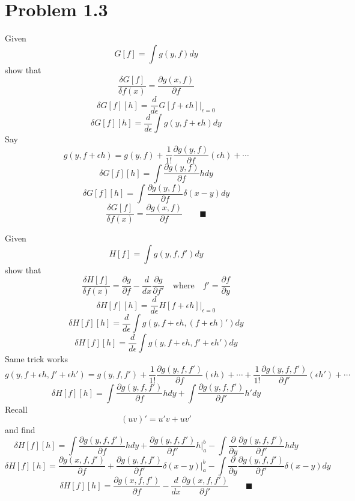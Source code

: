 \documentclass{amsart}
\begin{document}
\section*{Problem 1.3}
Given \[G[f]=\int g(y,f)dy\]
show that \[\frac{\delta G[f]}{\delta f(x)}=\frac{\partial g(x,f)}{\partial f} \]
\[\delta G[f][h]=\frac{d}{d\epsilon}G[f+\epsilon h]\Big\vert_{\epsilon=0}\]
\[\delta G[f][h]=\frac{d}{d\epsilon}\int g(y,f+\epsilon h)dy\]
Say \[g(y,f+\epsilon h)=g(y,f)+\frac{1}{1!}\frac{\partial g(y,f)}{\partial f}(\epsilon h) + \cdots \]
\[\delta G[f][h]=\int\frac{\partial g(y,f)}{\partial f}hdy\]
\[\delta G[f][h]=\int\frac{\partial g(y,f)}{\partial f}\delta(x-y)dy\]
\[\frac{\delta G[f]}{\delta f(x)}=\frac{\partial g(x,f)}{\partial f} \qquad \blacksquare\]

Given \[H[f]=\int g(y,f,f')dy\]
show that \[\frac{\delta H[f]}{\delta f(x)}=\frac{\partial g}{\partial f} -\frac{d}{dx}\frac{\partial g}{\partial f'} \quad\text{where}\quad f'=\frac{\partial f}{\partial y}\]
\[\delta H[f][h]=\frac{d}{d\epsilon}H[f+\epsilon h]\Big\vert_{\epsilon=0}\]
\[\delta H[f][h]=\frac{d}{d\epsilon}\int g(y,f+\epsilon h,(f+\epsilon h)')dy\]
\[\delta H[f][h]=\frac{d}{d\epsilon}\int g\left(y,f+\epsilon h,f'+\epsilon h'\right)dy\]
Same trick works \[g(y,f+\epsilon h,f'+\epsilon h')=g(y,f,f')+\frac{1}{1!}\frac{\partial g(y,f,f')}{\partial f}(\epsilon h) + \cdots +\frac{1}{1!}\frac{\partial g(y,f,f')}{\partial f'}(\epsilon h') + \cdots \]
\[\delta H[f][h]=\int\frac{\partial g(y,f,f')}{\partial f}hdy+\int\frac{\partial g(y,f,f')}{\partial f' }h'dy\] Recall \[(uv)'=u'v+uv'\] and find
\[\delta H[f][h]=\int\frac{\partial g(y,f,f')}{\partial f}hdy+\frac{\partial g(y,f,f')}{\partial f'}h\Big \vert_a^b-\int\frac{\partial}{\partial y}\frac{\partial g(y,f,f')}{\partial f'}hdy\]
\[\delta H[f][h]=\frac{\partial g(x,f,f')}{\partial f}+\frac{\partial g(y,f,f')}{\partial f'}\delta(x-y)\Big \vert_a^b-\int\frac{\partial}{\partial y}\frac{\partial g(y,f,f')}{\partial f'}\delta(x-y)dy\]
\[\delta H[f][h]=\frac{\partial g(x,f,f')}{\partial f}-\frac{d}{dx}\frac{\partial g(x,f,f')}{\partial f'} \qquad \blacksquare\]
\end{document}

